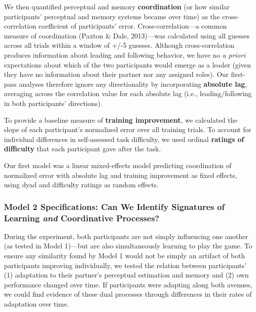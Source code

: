 \documentclass[10pt, letterpaper]{article}
\begin{document}
We then quantified perceptual and memory \textbf{coordination} (or how
similar participants' perceptual and memory systems became over time) as
the cross-correlation coefficient of participants' error.
Cross-correlation---a common measure of coordination (Paxton \& Dale,
2013)---was calculated using all guesses across all trials within a
window of +/-5 guesses. Although cross-correlation produces information
about leading and following behavior, we have no \emph{a priori}
expectations about which of the two participants would emerge as a
leader (given they have no information about their partner nor any
assigned roles). Our first-pass analyses therefore ignore any
directionality by incorporating \textbf{absolute lag}, averaging across
the correlation value for each absolute lag (i.e., leading/following in
both participants' directions).

To provide a baseline measure of \textbf{training improvement}, we
calculated the slope of each participant's normalized error over all
training trials. To account for individual differences in self-assessed
task difficulty, we used ordinal \textbf{ratings of difficulty} that
each participant gave after the task.

Our first model was a linear mixed-effects model predicting coordination
of normalized error with absolute lag and training improvement as fixed
effects, using dyad and difficulty ratings as random effects.

\subsubsection{\texorpdfstring{Model 2 Specifications: Can We Identify
Signatures of Learning \emph{and} Coordinative
Processes?}{Model 2 Specifications: Can We Identify Signatures of Learning and Coordinative Processes?}}\label{model-2-specifications-can-we-identify-signatures-of-learning-and-coordinative-processes}

During the experiment, both participants are not simply influencing one
another (as tested in Model 1)---but are also simultaneously learning to
play the game. To ensure any similarity found by Model 1 would not be
simply an artifact of both participants improving individually, we
tested the relation between participants' (1) adaptation to their
partner's perceptual estimation and memory and (2) own performance
changed over time. If participants were adapting along both avenues, we
could find evidence of these dual processes through differences in their
rates of adaptation over time.
\end{document}
